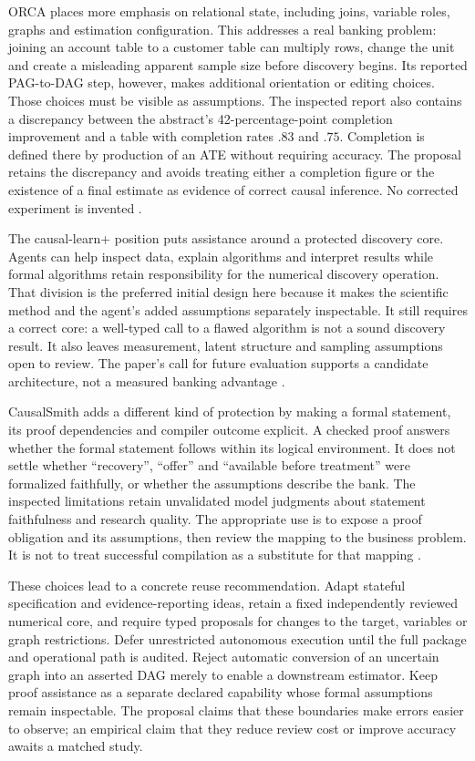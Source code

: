 ORCA places more emphasis on relational state, including joins, variable roles,
graphs and estimation configuration. This addresses a real banking problem:
joining an account table to a customer table can multiply rows, change the unit
and create a misleading apparent sample size before discovery begins. Its
reported PAG-to-DAG step, however, makes additional orientation or editing
choices. Those choices must be visible as assumptions. The inspected report
also contains a discrepancy between the abstract's 42-percentage-point
completion improvement and a table with completion rates $.83$ and $.75$.
Completion is defined there by production of an ATE without requiring accuracy.
The proposal retains the discrepancy and avoids treating either a completion
figure or the existence of a final estimate as evidence of correct causal
inference. No corrected experiment is invented
\citep{exec13_census_orca}.

The causal-learn+ position puts assistance around a protected discovery core.
Agents can help inspect data, explain algorithms and interpret results while
formal algorithms retain responsibility for the numerical discovery operation.
That division is the preferred initial design here because it makes the
scientific method and the agent's added assumptions separately inspectable.
It still requires a correct core: a well-typed call to a flawed algorithm is
not a sound discovery result. It also leaves measurement, latent structure and
sampling assumptions open to review. The paper's call for future evaluation
supports a candidate architecture, not a measured banking advantage
\citep{v12_la_2606_23608}.

CausalSmith adds a different kind of protection by making a formal statement,
its proof dependencies and compiler outcome explicit. A checked proof answers
whether the formal statement follows within its logical environment. It does
not settle whether ``recovery'', ``offer'' and ``available before treatment''
were formalized faithfully, or whether the assumptions describe the bank.
The inspected limitations retain unvalidated model judgments about statement
faithfulness and research quality. The appropriate use is to expose a proof
obligation and its assumptions, then review the mapping to the business problem.
It is not to treat successful compilation as a substitute for that mapping
\citep{exec13_census_causalsmith}.

These choices lead to a concrete reuse recommendation. Adapt stateful
specification and evidence-reporting ideas, retain a fixed independently
reviewed numerical core, and require typed proposals for changes to the target,
variables or graph restrictions. Defer unrestricted autonomous execution until
the full package and operational path is audited. Reject automatic conversion
of an uncertain graph into an asserted DAG merely to enable a downstream
estimator. Keep proof assistance as a separate declared capability whose
formal assumptions remain inspectable. The proposal claims that these boundaries
make errors easier to observe; an empirical claim that they reduce review cost
or improve accuracy awaits a matched study.

